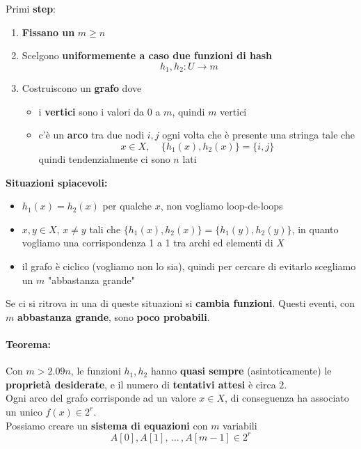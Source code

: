 Primi \textbf{step}:
\begin{enumerate}
	\item \textbf{Fissano un} $m \geq n$
	\item Scelgono \textbf{uniformemente a caso due funzioni di hash }
	$$ h_1, h_2: U \rightarrow m $$
	\item Costruiscono un \textbf{grafo} dove
	\begin{itemize}
		\item i \textbf{vertici} sono i valori da $0$ a $m$, quindi $m$ vertici
		\item c'è un \textbf{arco} tra due nodi $i,j$ ogni volta che è presente una stringa tale che 
		$$x \in X, \;\;\;\; \{h_1(x), h_2(x)\} = \{i,j\} $$
		quindi tendenzialmente ci sono $n$ lati
	\end{itemize}
\end{enumerate}

\textbf{Situazioni spiacevoli:} 
\begin{itemize}
	\item $h_1(x) = h_2 (x)$ per qualche $x$, non vogliamo loop-de-loops
	\item $x,y \in X$, $x \neq y$ tali che $\{h_1 (x), h_2 (x)\} = \{h_1 (y), h_2 (y)\}$, in quanto vogliamo una corrispondenza 1 a 1 tra archi ed elementi di $X$
	\item il grafo è ciclico (vogliamo non lo sia), quindi per cercare di evitarlo scegliamo un $m$ "abbastanza grande"
\end{itemize}
Se ci si ritrova in una di queste situazioni si \textbf{cambia funzioni}. Questi eventi, con $m$ \textbf{abbastanza grande}, sono \textbf{poco probabili}.

\newpage

\paragraph{Teorema:} Con $m > 2.09n$, le funzioni $h_1, h_2$ hanno \textbf{quasi sempre} (asintoticamente) le \textbf{proprietà desiderate}, e il numero di \textbf{tentativi attesi} è circa $2$.\\

Ogni arco del grafo corrisponde ad un valore $x \in X$, di conseguenza ha associato un unico $f(x) \in 2^r$.\\

Possiamo creare un \textbf{sistema di equazioni} con $m$ variabili
$$ A[0], A[1], \, \dots \, , A[m-1] \in 2^r $$

